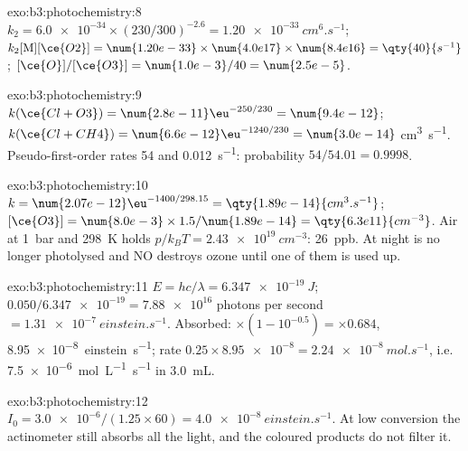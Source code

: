 \begin{solution}{exo:b3:photochemistry:8}
$k_2 = \num{6.0e-34} \times (230/300)^{-2.6} = \qty{1.20e-33}{cm^6.s^{-1}}$; $k_2[\mathrm M][\ce{O2}] = \num{1.20e-33} \times
\num{4.0e17} \times \num{8.4e16} = \qty{40}{s^{-1}}$; $[\ce{O}]/[\ce{O3}] = \num{1.0e-3}/40 = \num{2.5e-5}$.
\end{solution}

\begin{solution}{exo:b3:photochemistry:9}
$k(\ce{Cl + O3}) = \num{2.8e-11}\eu^{-250/230} = \num{9.4e-12}$; $k(\ce{Cl + CH4}) = \num{6.6e-12}\eu^{-1240/230} = \num{3.0e-14}$
\unit{cm^3.s^{-1}}. Pseudo-first-order rates 54 and \qty{0.012}{s^{-1}}: probability $54/54.01 = 0.9998$.
\end{solution}

\begin{solution}{exo:b3:photochemistry:10}
$k = \num{2.07e-12}\eu^{-1400/298.15} = \qty{1.89e-14}{cm^3.s^{-1}}$; $[\ce{O3}] = \num{8.0e-3} \times 1.5/\num{1.89e-14} =
\qty{6.3e11}{cm^{-3}}$. Air at \qty{1}{bar} and \qty{298}{K} holds $p/k_BT = \qty{2.43e19}{cm^{-3}}$: \qty{26}{ppb}. At night
 is no longer photolysed and NO destroys ozone until one of them is used up.
\end{solution}

\begin{solution}{exo:b3:photochemistry:11}
$E = hc/\lambda = \qty{6.347e-19}{J}$; $0.050/\num{6.347e-19} = \num{7.88e16}$ photons per second $= \qty{1.31e-7}{einstein.s^{-1}}$.
Absorbed: $\times(1 - 10^{-0.5}) = \times0.684$, \qty{8.95e-8}{einstein.s^{-1}}; rate $0.25 \times \num{8.95e-8} =
\qty{2.24e-8}{mol.s^{-1}}$, i.e. \qty{7.5e-6}{mol.L^{-1}.s^{-1}} in \qty{3.0}{mL}.
\end{solution}

\begin{solution}{exo:b3:photochemistry:12}
$I_0 = \num{3.0e-6}/(1.25 \times 60) = \qty{4.0e-8}{einstein.s^{-1}}$. At low conversion the actinometer
still absorbs all the light, and the coloured products do not filter it.
\end{solution}

